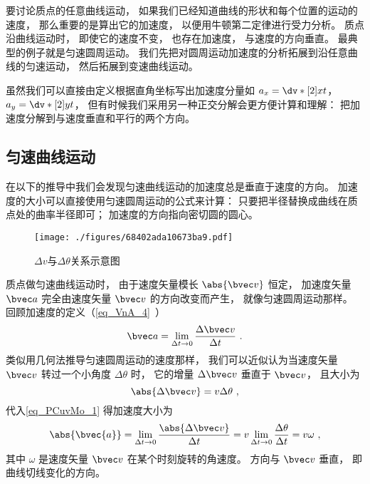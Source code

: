 

要讨论质点的任意曲线运动， 如果我们已经知道曲线的形状和每个位置的运动的速度， 那么重要的是算出它的加速度， 以便用牛顿第二定律进行受力分析。 质点沿曲线运动时， 即使它的速度不变， 也存在加速度， 与速度的方向垂直。 最典型的例子就是匀速圆周运动。 我们先把对圆周运动加速度的分析拓展到沿任意曲线的匀速运动， 然后拓展到变速曲线运动。

虽然我们可以直接由定义根据直角坐标写出加速度分量如 $a_x = \dv*[2]{x}{t}$， $a_y = \dv*[2]{y}{t}$， 但有时候我们采用另一种正交分解会更方便计算和理解： 把加速度分解到与速度垂直和平行的两个方向。

\subsection{匀速曲线运动}
在以下的推导中我们会发现匀速曲线运动的加速度总是垂直于速度的方向。 加速度的大小可以直接使用匀速圆周运动的公式来计算： 只要把半径替换成曲线在质点处的曲率半径即可； 加速度的方向指向密切圆的圆心。
\begin{figure}[ht]
\centering
\texttt{[image: ./figures/68402ada10673ba9.pdf]}
\caption{$\Delta v$与$\Delta \theta$关系示意图} \label{fig_PCuvMo_1}
\end{figure}

质点做匀速曲线运动时， 由于速度矢量模长 $\abs{\bvec v}$ 恒定， 加速度矢量 $\bvec a$ 完全由速度矢量 $\bvec v$ 的方向改变而产生， 就像匀速圆周运动那样。 回顾加速度的定义（\autoref{eq_VnA_4}~）
\begin{equation}\label{eq_PCuvMo_2}
\bvec a = \lim_{\Delta t \to 0} \frac{\Delta \bvec v}{\Delta t}~.
\end{equation}
类似用几何法推导匀速圆周运动的速度那样， 我们可以近似认为当速度矢量 $\bvec v$ 转过一个小角度 $\Delta \theta$ 时， 它的增量 $\Delta \bvec v$ 垂直于 $\bvec v$， 且大小为
\begin{equation}\label{eq_PCuvMo_1}
\abs{\Delta \bvec v} = v\Delta\theta~,
\end{equation}
代入\autoref{eq_PCuvMo_1} 得加速度大小为
\begin{equation}\label{eq_PCuvMo_4}
\abs{\bvec{a}} = \lim_{\Delta t \to 0} \frac{\abs{\Delta \bvec v}}{\Delta t}
= v\lim_{\Delta t \to 0}\frac{\Delta \theta}{\Delta t} = v\omega~,
\end{equation}
其中 $\omega$ 是速度矢量 $\bvec v$ 在某个时刻旋转的角速度。 方向与 $\bvec v$ 垂直， 即曲线切线变化的方向。

